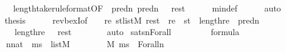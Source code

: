 \begin{isabellebody}
\ \ \ \ \isamarkupfalse%
\ length{\isacharunderscore}{\kern0pt}take{\isacharbrackleft}{\kern0pt}rule{\isacharunderscore}{\kern0pt}format{\isacharcomma}{\kern0pt}OF\ {\isacharunderscore}{\kern0pt}\ {\isacartoucheopen}pred{\isacharparenleft}{\kern0pt}n{\isacharparenright}{\kern0pt}{\isasymin}{\isacharunderscore}{\kern0pt}{\isacartoucheclose}{\isacharbrackright}{\kern0pt}\ {\isacartoucheopen}pred{\isacharparenleft}{\kern0pt}n{\isacharparenright}{\kern0pt}\ {\isasymle}\ {\isacharunderscore}{\kern0pt}{\isacartoucheclose}\ {\isacartoucheopen}rest{\isasymin}{\isacharunderscore}{\kern0pt}{\isacartoucheclose}\isanewline
\ \ \ \ \isamarkupfalse%
\ min{\isacharunderscore}{\kern0pt}def\isanewline
\ \ \ \ \isamarkupfalse%
\ auto\isanewline
\ \ \isamarkupfalse%
\isanewline
\ \ \isamarkupfalse%
\ {\isacharquery}{\kern0pt}thesis\isanewline
\ \ \ \ \isamarkupfalse%
\ rev{\isacharunderscore}{\kern0pt}bexI{\isacharbrackleft}{\kern0pt}of\ {\isacharunderscore}{\kern0pt}\ {\isacharunderscore}{\kern0pt}\ {\isachardoublequoteopen}{\isasymlambda}\ re{\isachardot}{\kern0pt}\ {\isasymexists}st{\isasymin}list{\isacharparenleft}{\kern0pt}M{\isacharparenright}{\kern0pt}{\isachardot}{\kern0pt}\ rest\ {\isacharequal}{\kern0pt}\ re\ {\isacharat}{\kern0pt}\ st\ {\isasymand}\ length{\isacharparenleft}{\kern0pt}re{\isacharparenright}{\kern0pt}\ {\isacharequal}{\kern0pt}\ pred{\isacharparenleft}{\kern0pt}n{\isacharparenright}{\kern0pt}{\isachardoublequoteclose}{\isacharbrackright}{\kern0pt}\isanewline
\ \ \ \ \ \ {\isacartoucheopen}length{\isacharparenleft}{\kern0pt}{\isacharquery}{\kern0pt}re{\isacharparenright}{\kern0pt}\ {\isacharequal}{\kern0pt}\ {\isacharunderscore}{\kern0pt}{\isacartoucheclose}\ {\isacartoucheopen}rest\ {\isacharequal}{\kern0pt}\ {\isacharunderscore}{\kern0pt}{\isacartoucheclose}\isanewline
\ \ \ \ \isamarkupfalse%
\ auto\isanewline
{}\isamarkupfalse%
%
\endisatagproof
{\isafoldproof}%
%
\isadelimproof
\isanewline
%
\endisadelimproof
\isanewline
{}\isamarkupfalse%
\ sats{\isacharunderscore}{\kern0pt}nForall{\isacharcolon}{\kern0pt}\isanewline
\ \ \isanewline
\ \ \ \ {\isachardoublequoteopen}{\isasymphi}\ {\isasymin}\ formula{\isachardoublequoteclose}\isanewline
\ \ \isanewline
\ \ \ \ {\isachardoublequoteopen}n{\isasymin}nat\ {\isasymLongrightarrow}\ ms\ {\isasymin}\ list{\isacharparenleft}{\kern0pt}M{\isacharparenright}{\kern0pt}\ {\isasymLongrightarrow}\isanewline
\ \ \ \ \ \ \ M{\isacharcomma}{\kern0pt}\ ms\ {\isasymTurnstile}\ {\isacharparenleft}{\kern0pt}Forall{\isacharcircum}{\kern0pt}n{\isacharparenleft}{\kern0pt}{\isasymphi}{\isacharparenright}{\kern0pt}{\isacharparenright}{\kern0pt}\ {\isasymlongleftrightarrow}\isanewline

\end{isabellebody}
